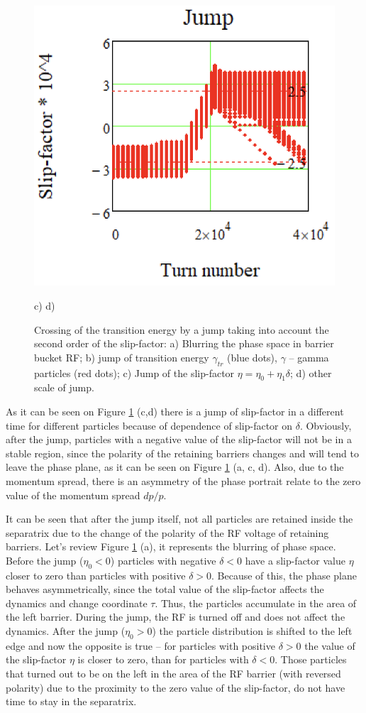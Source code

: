 \documentclass[a4paper]{jpconf}
\begin{document}
\begin{figure}[!htb]
   \includegraphics*[width=.48\columnwidth]{img/WEPOPT004_f4-4}\\
    \par \hspace{1.4cm} c)       \hspace{7.3cm} d)\\
   \caption{Crossing of the transition energy by a jump taking into account the second order of the slip-factor: a) Blurring the phase space in barrier bucket RF; b) jump of transition energy $\gamma_{tr}$ (blue dots), $\gamma$ – gamma particles (red dots); c) Jump of the slip-factor $\eta=\eta_{0}+\eta_{1}\delta$; d) other scale of jump.}
   \label{fig:modeling}
\end{figure}

\par As it can be seen on Figure \ref{fig:modeling} (c,d) there is a jump of slip-factor in a different time for different particles because of dependence of slip-factor on $\delta$. Obviously, after the jump, particles with a negative value of the slip-factor will not be in a stable region, since the polarity of the retaining barriers changes and will tend to leave the phase plane, as it can be seen on Figure \ref{fig:modeling} (a, c, d). Also, due to the momentum spread, there is an asymmetry of the phase portrait relate to the zero value of the momentum spread $dp/p$.

\par It can be seen that after the jump itself, not all particles are retained inside the separatrix due to the change of the polarity of the RF voltage of retaining barriers. Let’s review Figure \ref{fig:modeling} (a), it represents the blurring of phase space. Before the jump ($\eta_{0}<0$) particles with negative $\delta<0$ have a slip-factor value $\eta$ closer to zero than particles with positive $\delta>0$. Because of this, the phase plane behaves asymmetrically, since the total value of the slip-factor affects the dynamics and change coordinate $\tau$. Thus, the particles accumulate in the area of the left barrier. During the jump, the RF is turned off and does not affect the dynamics. After the jump ($\eta_{0}>0$) the particle distribution is shifted to the left edge and now the opposite is true – for particles with positive $\delta>0$ the value of the slip-factor $\eta$ is closer to zero, than for particles with $\delta<0$. Those particles that turned out to be on the left in the area of the RF barrier (with reversed polarity) due to the proximity to the zero value of the slip-factor, do not have time to stay in the separatrix.
\end{document}
